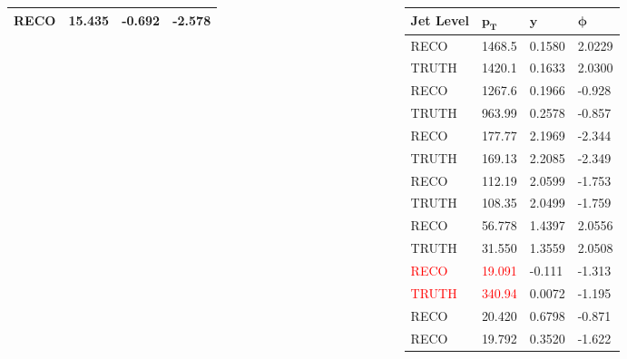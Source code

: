 \documentclass[compress]{beamer}
\begin{document}
\begin{frame}
\begin{columns}[onlytextwidth]
\begin{column}{0.5\textwidth}
\begin{table}
\begin{tabular}{l l l l}
        RECO  &  15.435 &  -0.692 &  -2.578 \\
        \bottomrule
      \end{tabular}
    \end{table}
  \end{column}
  \begin{column}{0.5\textwidth}
    \begin{table}
      \begin{tabular}{l l l l}
        \toprule
        \textbf{Jet Level} & $\mathbf{p_T}$ & $\mathbf{y}$ & $\mathbf{\phi}$ \\
        \midrule
        RECO  &  1468.5 &  0.1580 &  2.0229 \\
        TRUTH &  1420.1 &  0.1633 &  2.0300 \\
        \midrule
        RECO  &  1267.6 &  0.1966 &  -0.928 \\
        TRUTH &  963.99 &  0.2578 &  -0.857 \\
        \midrule
        RECO  &  177.77 &  2.1969 &  -2.344 \\
        TRUTH &  169.13 &  2.2085 &  -2.349 \\
        \midrule
        RECO  &  112.19 &  2.0599 &  -1.753 \\
        TRUTH &  108.35 &  2.0499 &  -1.759 \\
        \midrule
        RECO  &  56.778 &  1.4397 &  2.0556 \\
        TRUTH &  31.550 &  1.3559 &  2.0508 \\
        \midrule
        \textcolor{red}{RECO}  &  \textcolor{red}{19.091} &  -0.111 &  -1.313 \\
        \textcolor{red}{TRUTH} &  \textcolor{red}{340.94} &  0.0072 &  -1.195 \\
        \midrule
        \midrule
        RECO  &  20.420 &  0.6798 &  -0.871 \\
        RECO  &  19.792 &  0.3520 &  -1.622 \\
        \bottomrule
      \end{tabular}
    \end{table}
  \end{column}
\end{columns}
\normalsize
\end{frame}

\end{document}
